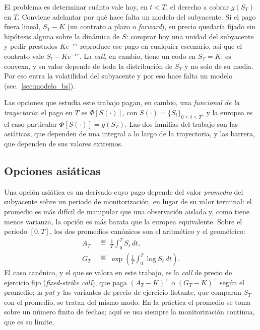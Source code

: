 El problema es determinar cuánto vale hoy, en $t < T$, el derecho a
cobrar $g(S_T)$ en $T$. Conviene adelantar por qué hace falta un modelo
del subyacente. Si el pago fuera lineal, $S_T - K$ (un contrato a plazo
o \emph{forward}), su precio quedaría fijado sin hipótesis alguna sobre
la dinámica de $S$: comprar hoy una unidad del subyacente y pedir
prestados $K e^{-r\tau}$ reproduce ese pago en cualquier escenario, así
que el contrato vale $S_t - K e^{-r\tau}$. La \emph{call}, en cambio,
tiene un codo en $S_T = K$: es convexa, y su valor depende de toda la
distribución de $S_T$ y no solo de su media. Por eso entra la
volatilidad del subyacente y por eso hace falta un modelo
(sec.~\ref{sec:modelo_bs}).

Las opciones que estudia este trabajo pagan, en cambio, una
\emph{funcional de la trayectoria}: el pago en $T$ es
$\Phi[S(\cdot)]$, con $S(\cdot) = \{S_t\}_{0 \leq t \leq T}$, y la
europea es el caso particular $\Phi[S(\cdot)] = g(S_T)$. Las dos
familias del trabajo son las asiáticas, que dependen de una integral a
lo largo de la trayectoria, y las barrera, que dependen de sus valores
extremos.

\subsection{Opciones asiáticas}
\label{subsec:asian_concepto}\label{sec:asian_definicion}
\label{subsec:asian_promedios}

Una opción asiática es un derivado cuyo pago depende del valor
\emph{promedio} del subyacente sobre un periodo de monitorización, en
lugar de su valor terminal: el promedio es más difícil de manipular que
una observación aislada y, como tiene menos varianza, la opción es más
barata que la europea equivalente. Sobre el periodo $[0, T]$, los dos promedios canónicos
son el aritmético y el geométrico:
\begin{align}
  A_T &\;\eqdef\; \frac{1}{T}\int_0^T S_t\, dt,
  \label{eq:promedio_aritmetico}\\
  G_T &\;\eqdef\; \exp\!\left(\frac{1}{T}\int_0^T \log S_t\, dt\right).
  \label{eq:promedio_geometrico}
\end{align}
El caso canónico, y el que se valora en este trabajo, es la \emph{call}
de precio de ejercicio fijo (\emph{fixed-strike call}), que paga
$(A_T - K)^+$ o $(G_T - K)^+$ según el promedio; la \emph{put} y las
variantes de precio de ejercicio flotante, que comparan $S_T$ con el
promedio, se tratan del mismo modo. En la práctica el promedio se toma
sobre un número finito de fechas; aquí se usa siempre la
monitorización continua, que es su límite.


